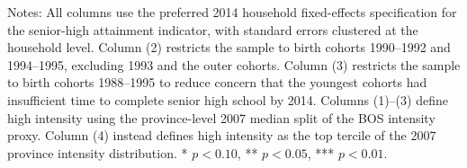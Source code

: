 \begin{table}[H]
\centering
\caption{Sensitivity Checks for Senior-High Attainment\label{tab:robust_hs}}
\footnotesize
{}

\vspace{0.5em}
\parbox{0.95\linewidth}{\footnotesize Notes: All columns use the preferred 2014 household fixed-effects specification for the senior-high attainment indicator, with standard errors clustered at the household level. Column (2) restricts the sample to birth cohorts 1990--1992 and 1994--1995, excluding 1993 and the outer cohorts. Column (3) restricts the sample to birth cohorts 1988--1995 to reduce concern that the youngest cohorts had insufficient time to complete senior high school by 2014. Columns (1)--(3) define high intensity using the province-level 2007 median split of the BOS intensity proxy. Column (4) instead defines high intensity as the top tercile of the 2007 province intensity distribution. * $p<0.10$, ** $p<0.05$, *** $p<0.01$.}
\end{table}
